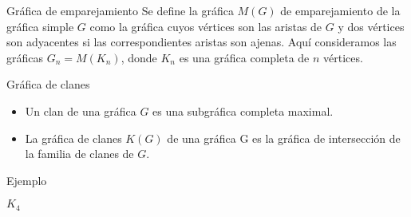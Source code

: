 \documentclass[final,xcolor=svgnames]{beamer}
\begin{document}
\begin{frame}{}
\begin{columns}
\begin{column}{0.5\textwidth}
     \begin{block}{Gráfica de emparejamiento}
       Se define la \alert{gráfica $M(G)$ de emparejamiento} de la gráfica
       simple $G$ como la gráfica cuyos vértices son las aristas de
       $G$ y dos vértices son adyacentes si las correspondientes
       aristas son ajenas. Aquí consideramos las gráficas
       $G_{n}=M(K_{n})$, donde $K_{n}$ es una gráfica completa de $n$ vértices.
     \end{block}
     
     \begin{block}{Gráfica de clanes}
       \begin{itemize}
       \item Un \alert{clan} de una gráfica $G$ es una subgráfica completa maximal. 
       \item La \alert{gráfica de clanes $K(G)$} de una gráfica G es la gráfica de intersección de
         la familia de clanes de $G$.   
       \end{itemize}
     \end{block}
     
      \begin{block}{Ejemplo}
        \begin{minipage}{0.3\linewidth} 
          \centering
          
          $K_{4}$
        \end{minipage}
        \begin{minipage}{0.3\linewidth}    
          \centering 


\end{minipage}
\end{block}
\end{column}
\end{columns}
\end{frame}
\end{document}
